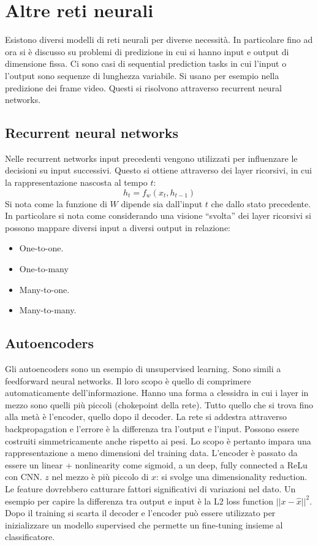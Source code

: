 \section{Altre reti neurali}
Esistono diversi modelli di reti neurali per diverse necessit\`a.
In particolare fino ad ora si \`e discusso su problemi di predizione in cui si hanno input e output di dimensione fissa.
Ci sono casi di sequential prediction tasks in cui l'input o l'output sono sequenze di lunghezza variabile.
Si usano per esempio nella predizione dei frame video. Questi si risolvono attraverso recurrent neural networks.

	\subsection{Recurrent neural networks}
	Nelle recurrent networks input precedenti vengono utilizzati per influenzare le decisioni su input successivi.
	Questo si ottiene attraverso dei layer ricorsivi, in cui la rappresentazione nascosta al tempo $t$:
	$$h_t = f_w(x_t, h_{t-1})$$
	Si nota come la funzione di $W$ dipende sia dall'input $t$ che dallo stato precedente.
	In particolare si nota come considerando una visione ``svolta'' dei layer ricorsivi si possono mappare diversi input a diversi output in relazione:
	\begin{multicols}{2}
		\begin{itemize}
			\item One-to-one.
			\item One-to-many
			\item Many-to-one.
			\item Many-to-many.
		\end{itemize}
	\end{multicols}

	\subsection{Autoencoders}
	Gli autoencoders sono un esempio di unsupervised learning.
	Sono simili a feedforward neural networks.
	Il loro scopo \`e quello di comprimere automaticamente dell'informazione.
	Hanno una forma a clessidra in cui i layer in mezzo sono quelli pi\`u piccoli (chokepoint della rete).
	Tutto quello che si trova fino alla met\`a \`e l'encoder, quello dopo il decoder.
	La rete si addestra attraverso backpropagation e l'errore \`e la differenza tra l'output e l'input.
	Possono essere costruiti simmetricamente anche rispetto ai pesi.
	Lo scopo \`e pertanto impara una rappresentazione a meno dimensioni del training data.
	L'encoder \`e passato da essere un linear + nonlinearity come sigmoid, a un deep, fully connected a ReLu con CNN.
	$z$ nel mezzo \`e pi\`u piccolo di $x$: si svolge una dimensionality reduction.
	Le feature dovrebbero catturare fattori significativi di variazioni nel dato.
	Un esempio per capire la differenza tra output e input \`e la L2 loss function $||x-\hat{x}||^2$.
	Dopo il training si scarta il decoder e l'encoder pu\`o essere utilizzato per inizializzare un modello supervised che permette un fine-tuning insieme al classificatore.

